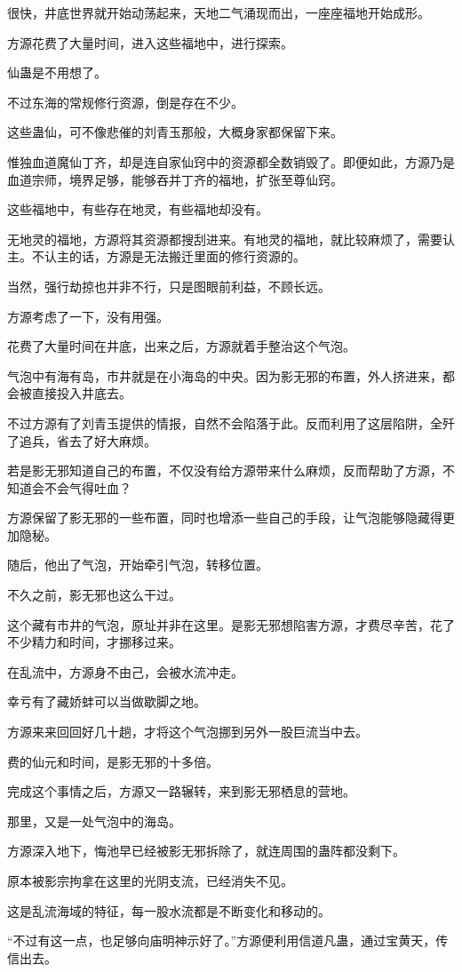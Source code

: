 \begin{this_body}
很快，井底世界就开始动荡起来，天地二气涌现而出，一座座福地开始成形。

方源花费了大量时间，进入这些福地中，进行探索。

仙蛊是不用想了。

不过东海的常规修行资源，倒是存在不少。

这些蛊仙，可不像悲催的刘青玉那般，大概身家都保留下来。

惟独血道魔仙丁齐，却是连自家仙窍中的资源都全数销毁了。即便如此，方源乃是血道宗师，境界足够，能够吞并丁齐的福地，扩张至尊仙窍。

这些福地中，有些存在地灵，有些福地却没有。

无地灵的福地，方源将其资源都搜刮进来。有地灵的福地，就比较麻烦了，需要认主。不认主的话，方源是无法搬迁里面的修行资源的。

当然，强行劫掠也并非不行，只是图眼前利益，不顾长远。

方源考虑了一下，没有用强。

花费了大量时间在井底，出来之后，方源就着手整治这个气泡。

气泡中有海有岛，市井就是在小海岛的中央。因为影无邪的布置，外人挤进来，都会被直接投入井底去。

不过方源有了刘青玉提供的情报，自然不会陷落于此。反而利用了这层陷阱，全歼了追兵，省去了好大麻烦。

若是影无邪知道自己的布置，不仅没有给方源带来什么麻烦，反而帮助了方源，不知道会不会气得吐血？

方源保留了影无邪的一些布置，同时也增添一些自己的手段，让气泡能够隐藏得更加隐秘。

随后，他出了气泡，开始牵引气泡，转移位置。

不久之前，影无邪也这么干过。

这个藏有市井的气泡，原址并非在这里。是影无邪想陷害方源，才费尽辛苦，花了不少精力和时间，才挪移过来。

在乱流中，方源身不由己，会被水流冲走。

幸亏有了藏娇蚌可以当做歇脚之地。

方源来来回回好几十趟，才将这个气泡挪到另外一股巨流当中去。

费的仙元和时间，是影无邪的十多倍。

完成这个事情之后，方源又一路辗转，来到影无邪栖息的营地。

那里，又是一处气泡中的海岛。

方源深入地下，悔池早已经被影无邪拆除了，就连周围的蛊阵都没剩下。

原本被影宗拘拿在这里的光阴支流，已经消失不见。

这是乱流海域的特征，每一股水流都是不断变化和移动的。

“不过有这一点，也足够向庙明神示好了。”方源便利用信道凡蛊，通过宝黄天，传信出去。

\end{this_body}

